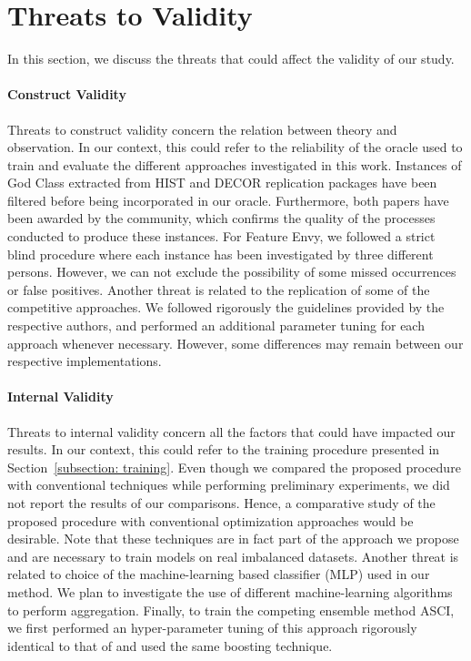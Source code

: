 \section{Threats to Validity}
\label{section: threats}

In this section, we discuss the threats that could affect the validity of our study.

\paragraph{Construct Validity} Threats to construct validity concern the relation between theory and observation. In our context, this could refer to the reliability of the oracle used to train and evaluate the different approaches investigated in this work. Instances of God Class extracted from HIST and DECOR replication packages have been filtered before being incorporated in our oracle. Furthermore, both papers have been awarded by the community, which confirms the quality of the processes conducted to produce these instances. For Feature Envy, we followed a strict blind procedure where each instance has been investigated by three different persons. However, we can not exclude the possibility of some missed occurrences or false positives. Another threat is related to the replication of some of the competitive approaches. We followed rigorously the guidelines provided by the respective authors, and performed an additional parameter tuning for each approach whenever necessary. However, some differences may remain between our respective implementations.

\paragraph{Internal Validity} Threats to internal validity concern all the factors that could have impacted our results. In our context, this could refer to the training procedure presented in Section~\ref{subsection: training}. Even though we compared the proposed procedure with conventional techniques while performing preliminary experiments, we did not report the results of our comparisons. Hence, a comparative study of the proposed procedure with conventional optimization approaches would be desirable. Note that these techniques are in fact part of the approach we propose and are necessary to train models on real imbalanced datasets. Another threat is related to choice of the machine-learning based classifier (MLP) used in our method. We plan to investigate the use of different machine-learning algorithms to perform aggregation. Finally, to train the competing ensemble method ASCI, we first performed an hyper-parameter tuning of this approach rigorously identical to that of \NAME{} and used the same boosting technique.

